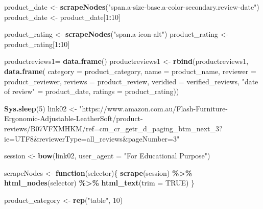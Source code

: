 \documentclass[
]{article}
\newenvironment{Shaded}{\begin{snugshade}}{\end{snugshade}}
\newcommand{\AttributeTok}[1]{\textcolor[rgb]{0.13,0.29,0.53}{#1}}
\newcommand{\ConstantTok}[1]{\textcolor[rgb]{0.56,0.35,0.01}{#1}}
\newcommand{\ControlFlowTok}[1]{\textcolor[rgb]{0.13,0.29,0.53}{\textbf{#1}}}
\newcommand{\DecValTok}[1]{\textcolor[rgb]{0.00,0.00,0.81}{#1}}
\newcommand{\FunctionTok}[1]{\textcolor[rgb]{0.13,0.29,0.53}{\textbf{#1}}}
\newcommand{\NormalTok}[1]{#1}
\newcommand{\OtherTok}[1]{\textcolor[rgb]{0.56,0.35,0.01}{#1}}
\newcommand{\SpecialCharTok}[1]{\textcolor[rgb]{0.81,0.36,0.00}{\textbf{#1}}}
\newcommand{\StringTok}[1]{\textcolor[rgb]{0.31,0.60,0.02}{#1}}
\begin{document}
\begin{Shaded}
\begin{Highlighting}[]
\NormalTok{  product\_date }\OtherTok{\textless{}{-}} \FunctionTok{scrapeNodes}\NormalTok{(}\StringTok{"span.a{-}size{-}base.a{-}color{-}secondary.review{-}date"}\NormalTok{)}
\NormalTok{  product\_date }\OtherTok{\textless{}{-}}\NormalTok{ product\_date[}\DecValTok{1}\SpecialCharTok{:}\DecValTok{10}\NormalTok{]}
  
\NormalTok{  product\_rating }\OtherTok{\textless{}{-}} \FunctionTok{scrapeNodes}\NormalTok{(}\StringTok{"span.a{-}icon{-}alt"}\NormalTok{)}
\NormalTok{  product\_rating }\OtherTok{\textless{}{-}}\NormalTok{ product\_rating[}\DecValTok{1}\SpecialCharTok{:}\DecValTok{10}\NormalTok{]}
  
\NormalTok{  productreviews1}\OtherTok{=} \FunctionTok{data.frame}\NormalTok{()}
\NormalTok{  productreviews1 }\OtherTok{\textless{}{-}} \FunctionTok{rbind}\NormalTok{(productreviews1, }\FunctionTok{data.frame}\NormalTok{(}
                      \AttributeTok{category =}\NormalTok{ product\_category,}
                      \AttributeTok{name =}\NormalTok{ product\_name,}
                      \AttributeTok{reviewer =}\NormalTok{ product\_reviewer,}
                      \AttributeTok{reviews =}\NormalTok{ product\_review,}
                      \AttributeTok{veridied =}\NormalTok{ verified\_reviews,}
                      \StringTok{"date of review"} \OtherTok{=}\NormalTok{ product\_date,}
                      \AttributeTok{ratings =}\NormalTok{ product\_rating))}

  
 \FunctionTok{Sys.sleep}\NormalTok{(}\DecValTok{5}\NormalTok{)}
\NormalTok{link02 }\OtherTok{\textless{}{-}} \StringTok{"https://www.amazon.com.au/Flash{-}Furniture{-}Ergonomic{-}Adjustable{-}LeatherSoft/product{-}reviews/B07VFXMHKM/ref=cm\_cr\_getr\_d\_paging\_btm\_next\_3?ie=UTF8\&reviewerType=all\_reviews\&pageNumber=3"}


\NormalTok{  session }\OtherTok{\textless{}{-}} \FunctionTok{bow}\NormalTok{(link02,}
               \AttributeTok{user\_agent =} \StringTok{"For Educational Purpose"}\NormalTok{)}

\NormalTok{  scrapeNodes }\OtherTok{\textless{}{-}} \ControlFlowTok{function}\NormalTok{(selector)\{}
    \FunctionTok{scrape}\NormalTok{(session) }\SpecialCharTok{\%\textgreater{}\%}
      \FunctionTok{html\_nodes}\NormalTok{(selector) }\SpecialCharTok{\%\textgreater{}\%}
      \FunctionTok{html\_text}\NormalTok{(}\AttributeTok{trim =} \ConstantTok{TRUE}\NormalTok{)}
\NormalTok{  \}}

\NormalTok{  product\_category }\OtherTok{\textless{}{-}} \FunctionTok{rep}\NormalTok{(}\StringTok{"table"}\NormalTok{, }\DecValTok{10}\NormalTok{)}


\end{Highlighting}
\end{Shaded}
\end{document}
